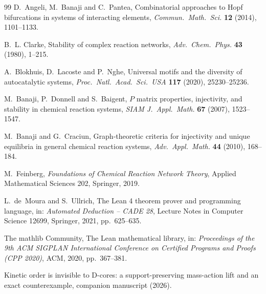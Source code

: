 \documentclass[11pt,a4paper]{article}
\theoremstyle{definition}
\theoremstyle{remark}
\begin{document}
\begin{thebibliography}{99}
D.~Angeli, M.~Banaji and C.~Pantea,
Combinatorial approaches to Hopf bifurcations in systems of interacting elements,
\emph{Commun.\ Math.\ Sci.} \textbf{12} (2014), 1101--1133.

B.~L. Clarke,
Stability of complex reaction networks,
\emph{Adv.\ Chem.\ Phys.} \textbf{43} (1980), 1--215.

A.~Blokhuis, D.~Lacoste and P.~Nghe,
Universal motifs and the diversity of autocatalytic systems,
\emph{Proc.\ Natl.\ Acad.\ Sci.\ USA} \textbf{117} (2020), 25230--25236.

M.~Banaji, P.~Donnell and S.~Baigent,
$P$ matrix properties, injectivity, and stability in chemical reaction systems,
\emph{SIAM J.\ Appl.\ Math.} \textbf{67} (2007), 1523--1547.

M.~Banaji and G.~Craciun,
Graph-theoretic criteria for injectivity and unique equilibria in general chemical reaction systems,
\emph{Adv.\ Appl.\ Math.} \textbf{44} (2010), 168--184.

M.~Feinberg,
\emph{Foundations of Chemical Reaction Network Theory},
Applied Mathematical Sciences 202, Springer, 2019.

L.~de~Moura and S.~Ullrich,
The Lean 4 theorem prover and programming language,
in: \emph{Automated Deduction -- CADE 28}, Lecture Notes in Computer Science 12699, Springer, 2021, pp.~625--635.

The mathlib Community,
The Lean mathematical library,
in: \emph{Proceedings of the 9th ACM SIGPLAN International Conference on Certified Programs and Proofs (CPP 2020)}, ACM, 2020, pp.~367--381.

Kinetic order is invisible to D-cores: a support-preserving mass-action lift and an exact counterexample,
companion manuscript (2026).

\end{thebibliography}
\end{document}
